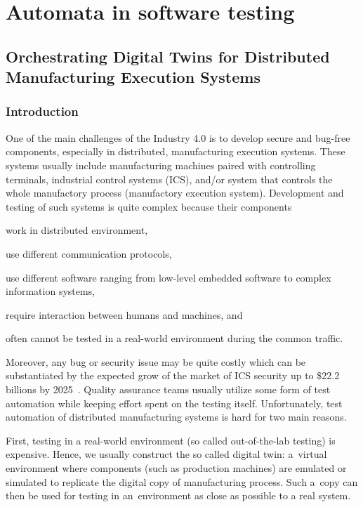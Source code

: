 {\part{Automata in software testing}

\chapter{Orchestrating Digital Twins for Distributed Manufacturing Execution Systems}
\label{ch:eurocast}
\section{Introduction}

One of the main challenges of the Industry 4.0 is to develop secure and
bug-free components, especially in distributed, manufacturing execution
systems. These systems usually include manufacturing machines paired with
controlling terminals, industrial control systems (ICS), and/or system that
controls the whole manufactory process (manufactory execution system).
Development and testing of such systems is quite complex because their
components
%
\begin{inparaenum}[(1)]
%
 \item work in distributed environment,
%
 \item use different communication protocols, 
%
 \item use different software ranging from low-level embedded software to
 complex information systems, 
%
 \item require interaction between humans and machines, and
%
 \item often cannot be tested in a real-world environment during the common
 traffic.
%
\end{inparaenum}

Moreover, any bug or security issue may be quite costly which can be
substantiated by the expected grow of the market of ICS security up to \$22.2
billions by 2025~\cite{ref_market}.
%
Quality assurance teams usually utilize some form of test automation 
while keeping effort spent on the testing itself.  Unfortunately, test
automation of distributed manufacturing systems is hard for two main reasons.


First, testing in a real-world environment (so called out-of-the-lab testing)
is expensive.  Hence, we usually construct the so called digital twin:
a~virtual environment where components (such as production machines) are
emulated or simulated to replicate the digital copy of manufacturing process.  
%
Such a~copy can then be used for testing in an~environment as close as possible
to a real system.

}
